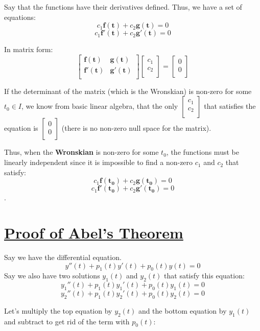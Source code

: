 \documentclass{report}
\begin{document}
{Say that the functions have their derivatives defined. Thus, we have a set of equations:
$$c_1\bm{f(t)} + c_2\bm{g(t)} = 0$$ 
$$c_1\bm{f'(t)} + c_2\bm{g'(t)} = 0$$ 

In matrix form:
$$
\begin{bmatrix}
    \bm{f(t)} & \bm{g(t)} \\
    \bm{f'(t)} & \bm{g'(t)} \\
\end{bmatrix}
\begin{bmatrix}
    c_1 \\
    c_2 \\
\end{bmatrix}
=
\begin{bmatrix}
    0 \\
    0 \\
\end{bmatrix}
$$

If the determinant of the matrix (which is the Wronskian) is non-zero for some $t_0 \in I$, we know from basic linear algebra, that the only $\begin{bmatrix}
    c_1 \\
    c_2 \\
\end{bmatrix}$ that satisfies the equation is $\begin{bmatrix}
    0 \\
    0 \\
\end{bmatrix}$ (there is no non-zero null space for the matrix).

Thus, when the \textbf{Wronskian} is non-zero for some $t_0$, the functions must be linearly independent since it is impossible to find a non-zero $c_1$ and $c_2$ that satisfy:
$$c_1\bm{f(t_0)} + c_2\bm{g(t_0)} = 0$$
$$c_1\bm{f'(t_0)} + c_2\bm{g'(t_0)} = 0$$.






\section{\hyperref[th:abel_thm]{Proof of Abel's Theorem}}
\label{sec:abel}
Say we have the differential equation.
$$y''(t) + p_1(t)y'(t) + p_0(t)y(t) = 0$$
Say we also have two solutions $y_1(t)$ and $y_2(t)$ that satisfy this equation:
$$y_1''(t) + p_1(t)y_1'(t) + p_0(t)y_1(t) = 0$$
$$y_2''(t) + p_1(t)y_2'(t) + p_0(t)y_2(t) = 0$$

Let's multiply the top equation by $y_2(t)$ and the bottom equation by $y_1(t)$ and subtract to get rid of the term with $p_0(t)$:

}
\end{document}
